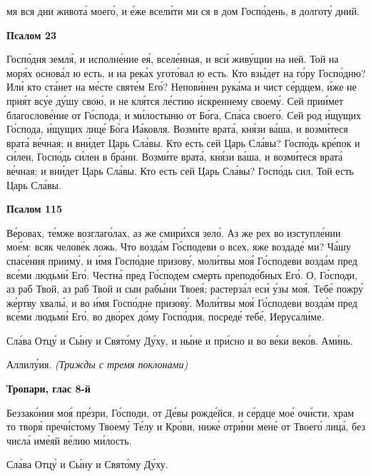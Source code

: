 мя вся дни живота́ моего́, и е́же всели́ти ми ся в дом Госпо́день, в долготу́
дний.



 

\bfseries Псалом 23\normalfont{}


   Госпо́дня земля́, и исполне́ние ея́, вселе́нная, и вси́ живу́щии на ней. Той
на моря́х основа́л ю есть, и на река́х угото́вал ю есть. Кто взы́дет на го́ру
Госпо́дню? Или́ кто ста́нет на ме́сте святе́м Его́? Непови́нен рука́ма и чист
се́рдцем, и́же не прия́т всу́е ду́шу свою́, и не кля́тся ле́стию и́скреннему
своему́. Сей прии́мет благослове́ние от Го́спода, и ми́лостыню от Бо́га, Спа́са
своего́. Сей род и́щущих Го́спода, и́щущих лице́ Бо́га Иа́ковля. Возми́те
врата́, кня́зи ва́ша, и возми́теся врата́ ве́чная; и вни́дет Царь Сла́вы.
Кто есть сей Царь Сла́вы? Госпо́дь кре́пок и си́лен, Госпо́дь си́лен в
бра́ни. Возми́те врата́, кня́зи ва́ша, и возми́теся врата́ ве́чная; и вни́дет
Царь Сла́вы. Кто есть сей Царь Сла́вы? Госпо́дь сил, Той есть Царь
Сла́вы.



 

\bfseries Псалом 115\normalfont{}


   Ве́ровах, те́мже возглаго́лах, аз же смири́хся зело́. Аз же рех во
изступле́нии мое́м: всяк челове́к ложь. Что возда́м Го́сподеви о всех, яже
воздаде́ ми? Ча́шу спасе́ния прииму́, и и́мя Госпо́дне призову́, моли́твы моя́
Го́сподеви возда́м пред все́ми людьми́ Его́. Честна́ пред Го́сподем смерть
преподо́бных Его́. О, Го́споди, аз раб Твой, аз раб Твой и сын рабы́ни Твоея́;
растерза́л еси́ у́зы моя́. Тебе́ пожру́ же́ртву хвалы́, и во и́мя Госпо́дне
призову́. Моли́твы моя́ Го́сподеви возда́м пред все́ми людьми́ Его́, во дво́рех
до́му Госпо́дня, посреде́ тебе́, Иерусали́ме.


   Сла́ва Отцу́ и Сы́ну и Свято́му Ду́ху, и ны́не и при́сно и во ве́ки веко́в.
Ами́нь.


   Аллилу́ия. \itshape (Трижды с тремя поклонами)\normalfont{}



 

\bfseries Тропари, глас 8-й\normalfont{}


   Беззако́ния моя́ пре́зри, Го́споди, от Де́вы рожде́йся, и се́рдце мое́ очи́сти,
храм то творя́ пречи́стому Твоему́ Те́лу и Кро́ви, ниже́ отри́ни мене́ от
Твоего́ лица́, без числа́ име́яй ве́лию ми́лость.


   Сла́ва Отцу́ и Сы́ну и Свято́му Ду́ху.


